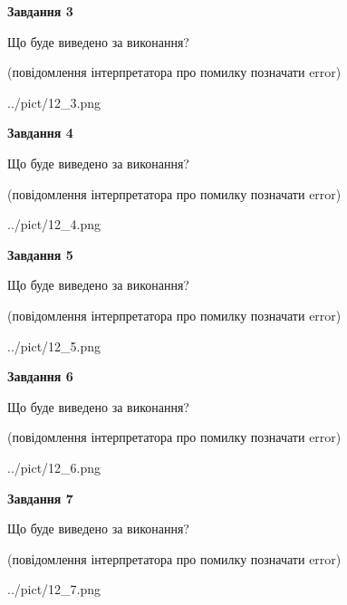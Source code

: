 \documentclass[12pt, ukrainian]{article}
\begin{document}
{\begin {large}
{\begin {center}\textbf{Завдання 3}\end {center}}\par
Що буде виведено за виконання?\par
 (повідомлення інтерпретатора про помилку позначати error)\par
\begin{center}
	{../pict/12_3.png}
\end{center}
\newpage

{\begin {center}\textbf{Завдання 4}\end {center}}\par
Що буде виведено за виконання?\par
 (повідомлення інтерпретатора про помилку позначати error)\par
\begin{center}
	{../pict/12_4.png}
\end{center}
\newpage

{\begin {center}\textbf{Завдання 5}\end {center}}\par
Що буде виведено за виконання?\par
 (повідомлення інтерпретатора про помилку позначати error)\par
\begin{center}
	{../pict/12_5.png}
\end{center}
\newpage

{\begin {center}\textbf{Завдання 6}\end {center}}\par
Що буде виведено за виконання?\par
 (повідомлення інтерпретатора про помилку позначати error)\par
\begin{center}
	{../pict/12_6.png}
\end{center}
\newpage

{\begin {center}\textbf{Завдання 7}\end {center}}\par
Що буде виведено за виконання?\par
 (повідомлення інтерпретатора про помилку позначати error)\par
\begin{center}
	{../pict/12_7.png}
\end{center}
\newpage


\end{large}}
\end{document}
